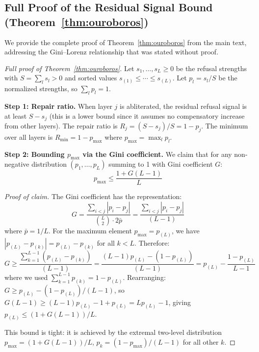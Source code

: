 \subsection{Full Proof of the Residual Signal Bound (Theorem~\ref{thm:ouroboros})}
\label{app:ouroboros_proof}

We provide the complete proof of Theorem~\ref{thm:ouroboros} from the main text, addressing the Gini--Lorenz relationship that was stated without proof.

\begin{proof}[Full proof of Theorem~\ref{thm:ouroboros}]
Let $s_1, \ldots, s_L \geq 0$ be the refusal strengths with $S = \sum_l s_l > 0$ and sorted values $s_{(1)} \leq \cdots \leq s_{(L)}$.
Let $p_l = s_l / S$ be the normalized strengths, so $\sum_l p_l = 1$.

\textbf{Step 1: Repair ratio.}
When layer $j$ is abliterated, the residual refusal signal is at least $S - s_j$ (this is a lower bound since it assumes no compensatory increase from other layers).
The repair ratio is $R_j = (S - s_j)/S = 1 - p_j$.
The minimum over all layers is $R_{\min} = 1 - p_{\max}$ where $p_{\max} = \max_l p_l$.

\textbf{Step 2: Bounding $p_{\max}$ via the Gini coefficient.}
We claim that for any non-negative distribution $(p_1, \ldots, p_L)$ summing to 1 with Gini coefficient $G$:
\begin{equation}
    p_{\max} \leq \frac{1 + G(L-1)}{L}
\end{equation}

\textit{Proof of claim.}
The Gini coefficient has the representation:
\begin{equation}
    G = \frac{\sum_{i<j}|p_i - p_j|}{\binom{L}{2} \cdot 2\bar{p}} = \frac{\sum_{i<j}|p_i - p_j|}{(L-1)}
\end{equation}
where $\bar{p} = 1/L$.
For the maximum element $p_{\max} = p_{(L)}$, we have $|p_{(L)} - p_{(k)}| = p_{(L)} - p_{(k)}$ for all $k < L$.
Therefore:
\begin{equation}
    G \geq \frac{\sum_{k=1}^{L-1}(p_{(L)} - p_{(k)})}{(L-1)} = \frac{(L-1)p_{(L)} - (1 - p_{(L)})}{(L-1)} = p_{(L)} - \frac{1 - p_{(L)}}{L-1}
\end{equation}
where we used $\sum_{k=1}^{L-1} p_{(k)} = 1 - p_{(L)}$.
Rearranging: $G \geq p_{(L)} - (1-p_{(L)})/(L-1)$, so
$G(L-1) \geq (L-1)p_{(L)} - 1 + p_{(L)} = Lp_{(L)} - 1$, giving $p_{(L)} \leq (1+G(L-1))/L$.

This bound is tight: it is achieved by the extremal two-level distribution $p_{\max} = (1+G(L-1))/L$, $p_k = (1-p_{\max})/(L-1)$ for all other $k$.


\end{proof}
